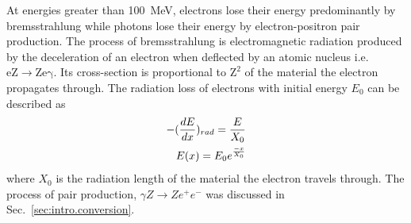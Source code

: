 At energies greater than 100~MeV, electrons lose their energy predominantly by bremsstrahlung while photons lose their energy by electron-positron pair production. The process of bremsstrahlung is electromagnetic radiation produced by the deceleration of an electron when deflected by an atomic nucleus i.e. $\mathrm{e Z \rightarrow Ze\gamma}$. Its cross-section is proportional to $\mathrm{Z^{2}}$ of the material the electron propagates through. The radiation loss of electrons with initial energy $E_0$ can be described as
\begin{align}\label{eq:electron_eloss}
-(\frac{dE}{dx})_{rad} = \frac{E}{X_{0}} \\ \vspace*{10 mm} E(x)=E_{0}e^{\frac{-x}{X_{0}}} 
\end{align}
where $X_{0}$ is the radiation length of the material the electron travels through. The process of pair production, $\gamma Z \rightarrow Ze^{+}e^{-}$ was discussed in Sec.~\ref{sec:intro.conversion}.

